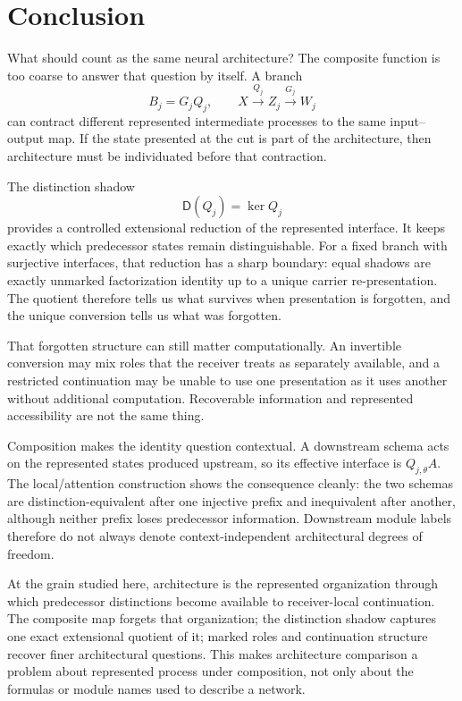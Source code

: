 \section{Conclusion}\label{sec:conclusion-v14}

What should count as the same neural architecture? The composite function is too coarse to answer that question by itself. A branch
\[
B_j=G_jQ_j,
\qquad
X\xrightarrow{Q_j}Z_j\xrightarrow{G_j}W_j
\]
can contract different represented intermediate processes to the same input--output map. If the state presented at the cut is part of the architecture, then architecture must be individuated before that contraction.

The distinction shadow
\[
\mathsf D(Q_j)=\ker Q_j
\]
provides a controlled extensional reduction of the represented interface. It keeps exactly which predecessor states remain distinguishable. For a fixed branch with surjective interfaces, that reduction has a sharp boundary: equal shadows are exactly unmarked factorization identity up to a unique carrier re-presentation. The quotient therefore tells us what survives when presentation is forgotten, and the unique conversion tells us what was forgotten.

That forgotten structure can still matter computationally. An invertible conversion may mix roles that the receiver treats as separately available, and a restricted continuation may be unable to use one presentation as it uses another without additional computation. Recoverable information and represented accessibility are not the same thing.

Composition makes the identity question contextual. A downstream schema acts on the represented states produced upstream, so its effective interface is $Q_{j,\theta}A$. The local/attention construction shows the consequence cleanly: the two schemas are distinction-equivalent after one injective prefix and inequivalent after another, although neither prefix loses predecessor information. Downstream module labels therefore do not always denote context-independent architectural degrees of freedom.

At the grain studied here, architecture is the represented organization through which predecessor distinctions become available to receiver-local continuation. The composite map forgets that organization; the distinction shadow captures one exact extensional quotient of it; marked roles and continuation structure recover finer architectural questions. This makes architecture comparison a problem about represented process under composition, not only about the formulas or module names used to describe a network.
